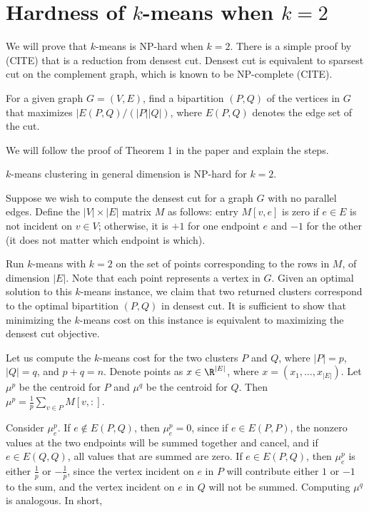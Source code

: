\section{Hardness of $k$-means when $k=2$}
We will prove that $k$-means is NP-hard when $k=2$. There is a simple proof by (CITE) that is a reduction from densest cut. Densest cut is equivalent to sparsest cut on the complement graph, which is known to be NP-complete (CITE).\\

\begin{definition}
    For a given graph $G=(V,E)$, find a bipartition $(P,Q)$ of the vertices in $G$ that maximizes $|E(P,Q)/(|P||Q|)$, where $E(P,Q)$ denotes the edge set of the cut.
\end{definition}

We will follow the proof of Theorem 1 in the paper and explain the steps.\\

\begin{theorem}
    $k$-means clustering in general dimension is NP-hard for $k=2$.
\end{theorem}

Suppose we wish to compute the densest cut for a graph $G$ with no parallel edges. Define the $|V|\times|E|$ matrix $M$ as follows: entry $M[v,e]$ is zero if $e\in E$ is not incident on $v\in V$; otherwise, it is $+1$ for one endpoint $e$ and $-1$ for the other (it does not matter which endpoint is which).

Run $k$-means with $k=2$ on the set of points corresponding to the rows in $M$, of dimension $|E|$. Note that each point represents a vertex in $G$. Given an optimal solution to this $k$-means instance, we claim that two returned clusters correspond to the optimal bipartition $(P,Q)$ in densest cut. It is sufficient to show that minimizing the $k$-means cost on this instance is equivalent to maximizing the densest cut objective.

Let us compute the $k$-means cost for the two clusters $P$ and $Q$, where $|P|=p$, $|Q|=q$, and $p+q=n$. Denote points as $x\in \R^{|E|}$, where $x=(x_1,\dots,x_{|E|})$. Let $\mu^p$ be the centroid for $P$ and $\mu^q$ be the centroid for $Q$. Then $\mu^p=\frac{1}{p}\sum_{v\in P}M[v,:]$.

Consider $\mu^p_e$. If $e\not\in E(P,Q)$, then $\mu^p_e=0$, since if $e\in E(P,P)$, the nonzero values at the two endpoints will be summed together and cancel, and if $e\in E(Q,Q)$, all values that are summed are zero. If $e\in E(P,Q)$, then $\mu^p_e$ is either $\frac{1}{p}$ or $-\frac{1}{p}$, since the vertex incident on $e$ in $P$ will contribute either $1$ or $-1$ to the sum, and the vertex incident on $e$ in $Q$ will not be summed. Computing $\mu^q$ is analogous. In short,

